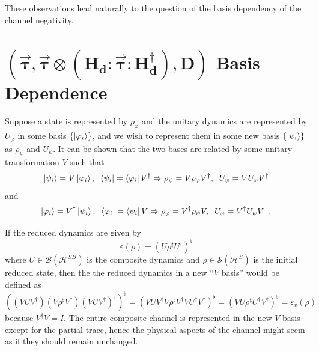 These observations lead naturally to the question of the basis dependency of the channel negativity.  

\section{$\mathbf{(\vec{\tau},\vec{\tau}\otimes \left( H_d:\vec{\tau}:H_d^\dagger\right),D)}$ Basis Dependence}

Suppose a state is represented by $\rho_\varphi$ and the unitary dynamics are represented by $U_\varphi$ in some basis $\{\left|\varphi_i\right\rangle\}$, and we wish to represent them in some new basis $\{\left|\psi_i\right\rangle\}$ as $\rho_\psi$ and $U_\psi$.  It can be shown \cite{Zettili2009} that the two bases are related by some unitary transformation $V$ such that
$$
\left|\psi_i\right\rangle = V\left|\varphi_i\right\rangle,\;\;\left\langle\psi_i\right| = \left\langle\varphi_i\right|V^\dagger \Rightarrow \rho_\psi = V\rho_\varphi V^\dagger,\;\;U_\psi = V U_\varphi V^\dagger
$$
and
$$
\left|\varphi_i\right\rangle = V^\dagger\left|\psi_i\right\rangle,\;\;\left\langle\varphi_i\right| = \left\langle\psi_i\right|V \Rightarrow \rho_\varphi = V^\dagger\rho_\psi V,\;\;U_\varphi = V^\dagger U_\psi V\;\;.
$$

If the reduced dynamics are given by
$$
\varepsilon(\rho) = \left(U\rho^\sharp U^\dagger\right)^\flat
$$
where $U\in\mathcal{B}(\mathcal{H}^{SB})$ is the composite dynamics and $\rho\in\mathcal{S}(\mathcal{H}^S)$ is the initial reduced state, then the the reduced dynamics in a new ``$V$ basis'' would be defined as
$$
\left(\left(V U V^\dagger \right)\left(V\rho^\sharp V^\dagger\right) \left(V U V^\dagger \right)^\dagger \right)^\flat = \left(V U V^\dagger V\rho^\sharp V^\dagger V U^\dagger V^\dagger \right)^\flat = \left(V U \rho^\sharp U^\dagger V^\dagger \right)^\flat = \varepsilon_v(\rho)
$$
because $V^\dagger V = I$.  The entire composite channel is represented in the new $V$ basis except for the partial trace, hence the physical aspects of the channel might seem as if they should remain unchanged.  

